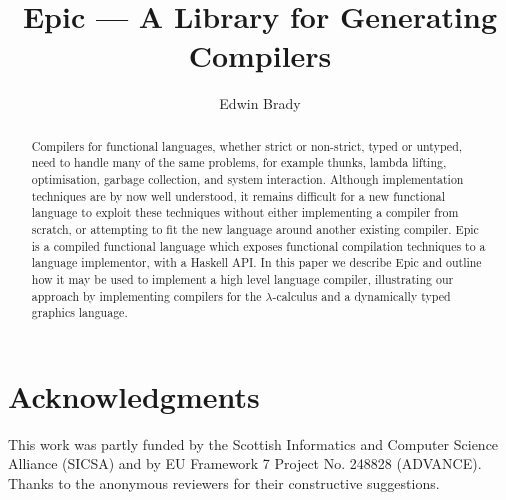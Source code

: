 \documentclass[orivec,dvips,10pt]{llncs}
\newcounter{per}
\begin{document}
\title{Epic --- A Library for Generating Compilers}
\author{Edwin Brady}


\maketitle

\begin{abstract}
Compilers for functional languages, whether strict or non-strict,
typed or untyped, need to handle many of the same problems, for
example thunks, lambda lifting, optimisation, garbage collection, and
system interaction.  Although implementation techniques are by now
well understood, it remains difficult for a new functional language to
exploit these techniques without either implementing a compiler from
scratch, or attempting to fit the new language around another existing
compiler.  Epic is a compiled functional language which exposes
functional compilation techniques to a language implementor, with a
Haskell API. In this paper we describe Epic and outline how it may be
used to implement a high level language compiler, illustrating our
approach by implementing compilers for the $\lambda$-calculus and a
dynamically typed graphics language.

\end{abstract}









%

%



\vspace{-0.2in}
\section*{Acknowledgments}

This work was partly funded by the Scottish Informatics and Computer
Science Alliance (SICSA) and by EU Framework 7 Project No. 248828
(ADVANCE). Thanks to the anonymous
reviewers for their constructive suggestions.


\begin{small}


\appendix

%

\end{small}
\end{document}
